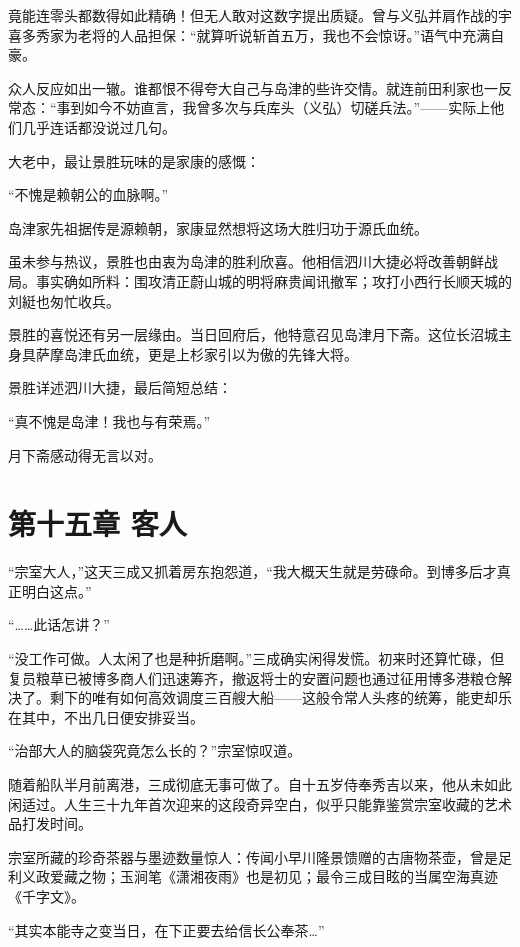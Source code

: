 \documentclass[
]{book}
\begin{document}
竟能连零头都数得如此精确！但无人敢对这数字提出质疑。曾与义弘并肩作战的宇喜多秀家为老将的人品担保：``就算听说斩首五万，我也不会惊讶。''语气中充满自豪。

众人反应如出一辙。谁都恨不得夸大自己与岛津的些许交情。就连前田利家也一反常态：``事到如今不妨直言，我曾多次与兵库头（义弘）切磋兵法。''------实际上他们几乎连话都没说过几句。

大老中，最让景胜玩味的是家康的感慨：

``不愧是赖朝公的血脉啊。''

岛津家先祖据传是源赖朝，家康显然想将这场大胜归功于源氏血统。

虽未参与热议，景胜也由衷为岛津的胜利欣喜。他相信泗川大捷必将改善朝鲜战局。事实确如所料：围攻清正蔚山城的明将麻贵闻讯撤军；攻打小西行长顺天城的刘綎也匆忙收兵。

景胜的喜悦还有另一层缘由。当日回府后，他特意召见岛津月下斋。这位长沼城主身具萨摩岛津氏血统，更是上杉家引以为傲的先锋大将。

景胜详述泗川大捷，最后简短总结：

``真不愧是岛津！我也与有荣焉。''

月下斋感动得无言以对。

\chapter*{第十五章 客人}\label{ux7b2cux5341ux4e94ux7ae0-ux5ba2ux4eba}

``宗室大人，''这天三成又抓着房东抱怨道，``我大概天生就是劳碌命。到博多后才真正明白这点。''

``\ldots\ldots 此话怎讲？''

``没工作可做。人太闲了也是种折磨啊。''三成确实闲得发慌。初来时还算忙碌，但复员粮草已被博多商人们迅速筹齐，撤返将士的安置问题也通过征用博多港粮仓解决了。剩下的唯有如何高效调度三百艘大船------这般令常人头疼的统筹，能吏却乐在其中，不出几日便安排妥当。

``治部大人的脑袋究竟怎么长的？''宗室惊叹道。

随着船队半月前离港，三成彻底无事可做了。自十五岁侍奉秀吉以来，他从未如此闲适过。人生三十九年首次迎来的这段奇异空白，似乎只能靠鉴赏宗室收藏的艺术品打发时间。

宗室所藏的珍奇茶器与墨迹数量惊人：传闻小早川隆景馈赠的古唐物茶壶，曾是足利义政爱藏之物；玉涧笔《潇湘夜雨》也是初见；最令三成目眩的当属空海真迹《千字文》。

``其实本能寺之变当日，在下正要去给信长公奉茶\ldots{}''
\end{document}
